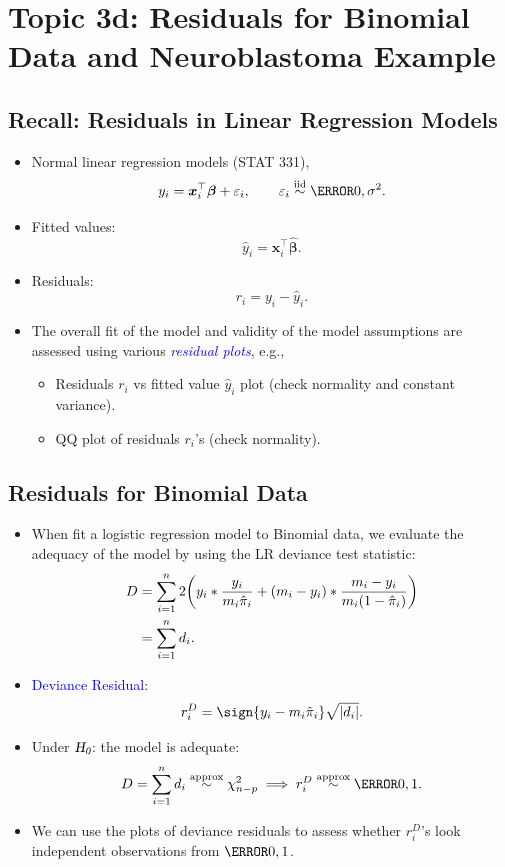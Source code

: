 \documentclass{article}\usepackage[]{graphicx}\usepackage[svgnames]{xcolor}
\let\log\relax%
\newcommand{\HN}{\textsl{H}_{\textsl{0}}}%
\newcommand{\iid}{\overset{\text{iid}}{\sim}}%
\DeclarePairedDelimiter\abs{\lvert}{\rvert}
\providecommand{\Vector}[1]{\bm{#1}}%
\newcommand{\makeheading}[2]%
{%
\begin{center}%
    \makebox[\linewidth]{\raisebox{-.5ex}[0cm][0cm]{\stackanchor{\textcolor{Gray}{\textsc{#1}}}{\scriptsize\itshape\printyearoff#2}\;}\color{Crimson!50}\hrulefill}%
\end{center}%
}%
\begin{document}
\makeheading{Week 5}{\daterange{2021-10-03}{2021-10-08}}
\section*{Topic 3d: Residuals for Binomial Data and Neuroblastoma Example}
\subsection*{Recall: Residuals in Linear Regression Models}
\begin{itemize}
    \item Normal linear regression models (STAT 331),
          \[ y_i=\Vector{x}_i^\top \Vector{\beta}+\varepsilon_i,\qquad \varepsilon_i\iid\N{0,\sigma^2}. \]
    \item Fitted values:
          \[ \hat{y}_i=\Vector{x}_i^\top \hat{\Vector{\beta}}. \]
    \item Residuals:
          \[ r_i=y_i-\hat{y}_i. \]
    \item The overall fit of the model and validity of the model assumptions are assessed using various \textcolor{Blue}{\emph{residual plots}},
          e.g.,
          \begin{itemize}
              \item Residuals $ r_i $ vs fitted value $ \hat{y}_i $ plot (check normality and constant variance).
              \item QQ plot of residuals $ r_i $'s (check normality).
          \end{itemize}
\end{itemize}
\subsection*{Residuals for Binomial Data}
\begin{itemize}
    \item When fit a logistic regression model to Binomial data, we evaluate the adequacy of the model by using the LR deviance test statistic:
          \begin{align*}
              D
               & =\sum_{i=1}^{n} 2\biggl(y_i\log*{\frac{y_i}{m_i\hat{\pi}_i}}+(m_i-y_i)\log*{\frac{m_i-y_i}{m_i(1-\hat{\pi}_i)}}\biggr) \\
               & =\sum_{i=1}^{n} d_i.
          \end{align*}
    \item \textcolor{Blue}{Deviance Residual}:
          \[ r_i^D=\sign{y_i-m_i\hat{\pi}_i}\sqrt{\abs{d_i}}. \]
    \item Under $ \HN $: the model is adequate:
          \[ D=\sum_{i=1}^{n} d_i\stackrel{\text{approx}}{\sim}\chi^2_{n-p}\implies r_i^D\stackrel{\text{approx}}{\sim}\N{0,1}. \]
    \item We can use the plots of deviance residuals to assess whether $ r_i^D $'s look independent observations from $ \N{0,1} $.
\end{itemize}
\end{document}
